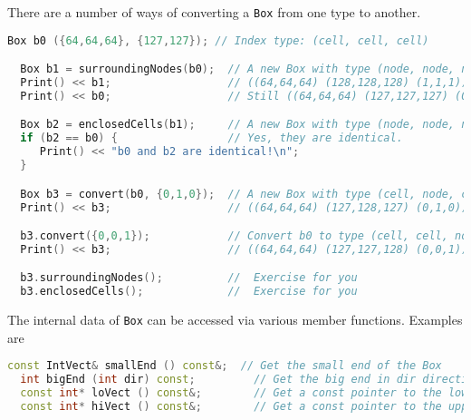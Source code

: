 There are a number of ways of converting a {\tt Box} from one type to
another.
\begin{lstlisting}[language=cpp]
  Box b0 ({64,64,64}, {127,127}); // Index type: (cell, cell, cell)

  Box b1 = surroundingNodes(b0);  // A new Box with type (node, node, node)
  Print() << b1;                  // ((64,64,64) (128,128,128) (1,1,1))
  Print() << b0;                  // Still ((64,64,64) (127,127,127) (0,0,0))

  Box b2 = enclosedCells(b1);     // A new Box with type (node, node, node)
  if (b2 == b0) {                 // Yes, they are identical.
     Print() << "b0 and b2 are identical!\n";
  }

  Box b3 = convert(b0, {0,1,0});  // A new Box with type (cell, node, cell)
  Print() << b3;                  // ((64,64,64) (127,128,127) (0,1,0))

  b3.convert({0,0,1});            // Convert b0 to type (cell, cell, node)
  Print() << b3;                  // ((64,64,64) (127,127,128) (0,0,1))

  b3.surroundingNodes();          //  Exercise for you
  b3.enclosedCells();             //  Exercise for you
\end{lstlisting}

The internal data of {\tt Box} can be accessed via various member functions.
Examples are
\begin{lstlisting}[language=cpp]
  const IntVect& smallEnd () const&;  // Get the small end of the Box
  int bigEnd (int dir) const;         // Get the big end in dir direction
  const int* loVect () const&;        // Get a const pointer to the lower end
  const int* hiVect () const&;        // Get a const pointer to the upper end
\end{lstlisting}

